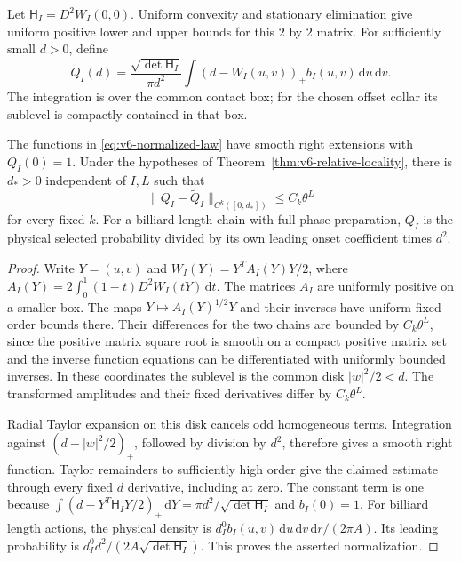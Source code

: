 Let $\mathsf H_I=D^2W_I(0,0)$. Uniform convexity and stationary
elimination give uniform positive lower and upper bounds for this
$2$ by $2$ matrix. For sufficiently small $d>0$, define
\begin{equation}\label{eq:v6-normalized-law}
 Q_I(d)=\frac{\sqrt{\det\mathsf H_I}}{\pi d^2}
       \int(d-W_I(u,v))_+b_I(u,v)\,\mathrm du\,\mathrm dv.
\end{equation}
The integration is over the common contact box; for the chosen offset
collar its sublevel is compactly contained in that box.

\begin{corollary}
\label{cor:v6-law-locality}
The functions in \eqref{eq:v6-normalized-law} have smooth right
extensions with $Q_I(0)=1$. Under the hypotheses of
Theorem~\ref{thm:v6-relative-locality}, there is $d_*>0$ independent
of $I,L$ such that
\[
 \|Q_I-\widetilde Q_I\|_{C^k([0,d_*])}\le C_k\theta^L
\]
for every fixed $k$. For a billiard length chain with full-phase
preparation, $Q_I$ is the physical selected probability divided by
its own leading onset coefficient times $d^2$.
\end{corollary}
\begin{proof}
Write $Y=(u,v)$ and
$W_I(Y)=Y^T A_I(Y)Y/2$, where
$A_I(Y)=2\int_0^1(1-t)D^2W_I(tY)\,\mathrm dt$.
The matrices $A_I$ are uniformly positive on a smaller box. The maps
$Y\mapsto A_I(Y)^{1/2}Y$ and their inverses have uniform fixed-order
bounds there. Their differences for the two chains are bounded by
$C_k\theta^L$, since the positive matrix square root is smooth on a
compact positive matrix set and the inverse function equations can be
differentiated with uniformly bounded inverses. In these coordinates
the sublevel is the common disk $|w|^2/2<d$. The transformed amplitudes
and their fixed derivatives differ by $C_k\theta^L$.

Radial Taylor expansion on this disk cancels odd homogeneous terms.
Integration against $(d-|w|^2/2)_+$, followed by division by $d^2$,
therefore gives a smooth right function. Taylor remainders to sufficiently
high order give the claimed estimate through every fixed $d$ derivative,
including at zero. The constant term is one because
$\int(d-Y^T\mathsf H_IY/2)_+\,\mathrm dY
=\pi d^2/\sqrt{\det\mathsf H_I}$ and $b_I(0)=1$.
For billiard length actions, the physical density is
$d_I^0b_I(u,v)\,\mathrm du\,\mathrm dv\,\mathrm dr/(2\pi A)$.
Its leading probability is
$d_I^0d^2/(2A\sqrt{\det\mathsf H_I})$.
This proves the asserted normalization.
\end{proof}

